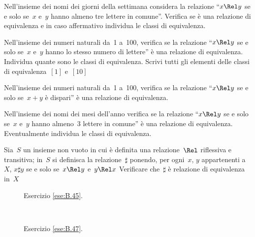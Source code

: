\begin{multicols}{2}

\begin{esercizio}
\label{ese:B.39}
Nell'insieme dei nomi dei giorni della settimana considera la relazione 
``$x \Rel y$ se e solo se~$x$ e~$y$ hanno almeno tre lettere in comune''.
Verifica se è una relazione di equivalenza e in caso affermativo individua le
classi di equivalenza.
\end{esercizio}

\begin{esercizio}
\label{ese:B.40}
Nell'insieme dei numeri naturali da~1 a~100, verifica se la relazione 
``$x \Rel y$ se e solo se~$x$ e~$y$ hanno lo stesso numero di lettere''
è una relazione di equivalenza. Individua quante sono le classi di equivalenza.
Scrivi tutti gli elementi delle classi di equivalenza~$[1]$ e~$[10]$
\end{esercizio}

\begin{esercizio}
\label{ese:B.41}
Nell'insieme dei numeri naturali da~1 a~100, verifica se la relazione 
``$x \Rel y$ se e solo se~$x+y$ è dispari'' è una relazione di equivalenza.
\end{esercizio}

\begin{esercizio}
\label{ese:B.42}
Nell'insieme dei nomi dei mesi dell'anno verifica se la relazione ``$x \Rel y$ 
se e solo se~$x$ e~$y$ hanno almeno~3 lettere in comune'' è una relazione di 
equivalenza. Eventualmente individua le classi di equivalenza.
\end{esercizio}

\begin{esercizio}
\label{ese:B.43}
Sia~$S$ un insieme non vuoto in cui è definita una relazione~$\Rel$ riflessiva 
e transitiva; in~$S$ si definisca la relazione~$\sharp$ ponendo,
per ogni~$x$, $y$ appartenenti a~$X$, $x \sharp y$ 
se e solo se~$x \Rel y$ e~$y \Rel x$ Verificare che~$\sharp$ è relazione di 
equivalenza in~$X$
\end{esercizio}
\end{multicols}

\begin{inaccessibleblock}
 \begin{figure}[t]
\begin{minipage}[b]{.45\textwidth}
 \centering
 
 \caption{Esercizio \ref{ese:B.45}.}\label{fig:B.20}
\end{minipage}\
\begin{minipage}[b]{.45\textwidth}
 \centering
 
 \caption{Esercizio \ref{ese:B.47}.}\label{fig:B.21}
\end{minipage}
\end{figure}
\end{inaccessibleblock}

